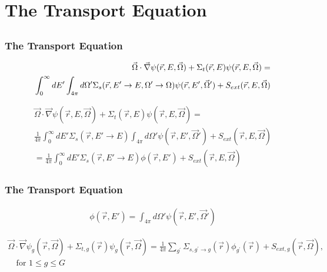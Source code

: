 \documentclass[]{beamer}
\newcommand{\vr}{\vec{r}}
\newcommand{\vo}{\vec{\Omega}}
\begin{document}

\section{The Transport Equation}
\subsection{}
\begin{frame}[t]\frametitle{The Transport Equation}
	\begin{block}{}
	\begin{align*}
\hspace{-10cm} \vo \cdot \vec \nabla \psi(\vr,E,\vo) +\Sigma_t(\vr,E) \psi(\vr,E,\vo)  = \\ \int_{0}^{\infty}dE' \int_{4\pi}d\Omega' \Sigma_s(\vr,E'\to E, \Omega'\to\Omega)\psi(\vr,E',\vo') + S_{ext}(\vr,E,\vo)
	\label{continuous transport}
	\end{align*}
	\end{block}
	\begin{block}{}
	\begin{align*}
	\vo \cdot \vec \nabla \psi(\vr,E,\vo) +\Sigma_t(\vr,E) \psi(\vr,E,\vo)  
	= \\\frac{1}{4\pi}\int_{0}^{\infty}dE' \Sigma_s(\vr,E'\to E) \int_{4\pi}d\Omega' \psi(\vr,E',\vo')  + S_{ext}(\vr,E,\vo) \nonumber \\
	 = \frac{1}{4\pi}\int_{0}^{\infty}dE' \Sigma_s(\vr,E'\to E) \phi(\vr,E')  + S_{ext}(\vr,E,\vo)
	\end{align*}
	\end{block}
\end{frame}

\begin{frame}[t]\frametitle{The Transport Equation}
	\begin{block}{}
	\begin{align*}
		\phi(\vr,E') = \int_{4\pi}d\Omega' \psi(\vr,E',\vo')
	\end{align*}
	\end{block}
	\begin{block}{}
	\begin{align*}
	\vo \cdot \vec \nabla \psi_g(\vr,\vo) +\Sigma_{t,g}(\vr) \psi_g(\vr,\vo) = \frac{1}{4\pi}\sum_{g^{\prime}}\Sigma_{s,g^{\prime}\to g}(\vr)\phi_{g^{\prime}}(\vr) + S_{ext,g}(\vr,\vo), \\\quad \text{for } 1 \le g \le G
	\end{align*}
	\end{block}
\end{frame}
\end{document}
